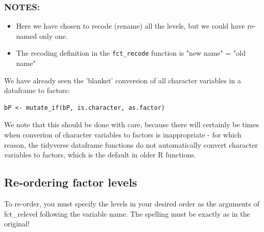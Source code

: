 \documentclass[titlepage]{book}\usepackage{knitr}
\begin{document}
\begin{knitrout}
\color{fgcolor}
\end{knitrout}
\subsubsection{NOTES:}
\begin{itemize}
\item{Here we have chosen to recode (rename) all the levels, but we could have re-named only one.}
\item{The recoding definition in the \texttt{fct\_recode} function is "new name" = "old name" }
\end{itemize}

We have already seen the 'blanket' conversion of all character variables in a dataframe to factors:

\begin{verbatim}
bP <- mutate_if(bP, is.character, as.factor)
\end{verbatim}

We note that this should be done with care, because there will certainly be times when converion of character variables to factors is inappropriate - for which reason, the tidyverse dataframe functions do not automatically convert character variables to factors, which is the default in older R functions.

\subsection{ Re-ordering factor levels}
To re-order, you must specify the levels in your desired order as the arguments of fct\_relevel following the variable name.  The spelling must be exactly as in the original!

\begin{knitrout}
\color{fgcolor}
\end{knitrout}
\end{document}
